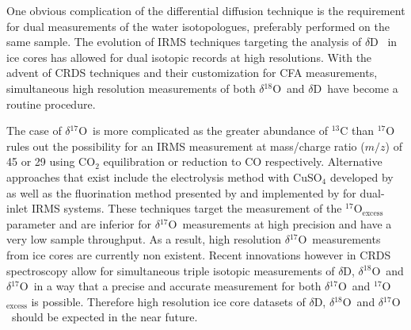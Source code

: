 \documentclass[11pt, draftcls, onecolumn]{IEEEtran} %
\numberwithin{equation}{section}
\numberwithin{table}{section}
\numberwithin{figure}{section}
\newcommand{\delOx}{$\delta{}^{18}\mathrm{O}$}
\newcommand{\delOxb}{$\delta{}^{17}\mathrm{O}$}
\newcommand{\delD}{$\delta\mathrm{D}$}
\begin{document}
One obvious complication of the differential diffusion technique is the requirement for dual measurements of the water 
isotopologues, preferably performed on the same sample.
The evolution of IRMS techniques targeting the analysis of \delD~\citep{BIGELEISEN1952, Vaughn1998, Gehre1996, Begley1997} in ice cores has allowed for dual isotopic records
at high resolutions. With the advent of CRDS techniques and their customization for CFA measurements,
simultaneous high resolution measurements of both \delOx~and \delD~have become a routine procedure.

The case of \delOxb~is more complicated as the greater abundance of $^{13}$C than $^{17}$O rules out the
possibility for an IRMS measurement  at mass/charge ratio ($m/z$) of 45 or 29 using 
CO$_2$ equilibration or reduction to CO respectively. Alternative approaches that exist include the
electrolysis method with CuSO$_4$ developed by  \cite{Meijer1998} as well as the fluorination method
presented by \cite{Baker2002} and implemented by \cite{Barkan2005} for dual-inlet IRMS systems.
These techniques target the measurement of the $^{17}${O}$_{\mathrm{excess}}$ parameter and are inferior for
\delOxb~measurements at high precision and have a very low sample throughput.
As a result, high resolution \delOxb~measurements from ice cores are currently non existent. 
Recent innovations however in CRDS spectroscopy \citep{Steig2014} allow for simultaneous 
triple isotopic measurements of \delD, \delOx~and \delOxb~in a way that  a precise and accurate measurement 
for both \delOxb~and $^{17}${O}$_{\mathrm{excess}}$ is possible. Therefore high resolution ice core datasets of
\delD, \delOx~and \delOxb~should be expected in the near future. 
\end{document}
